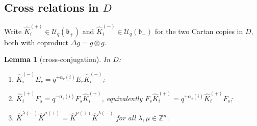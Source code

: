\documentclass[11pt]{article}
\newtheorem{lemma}[theorem]{Lemma}
\theoremstyle{definition}
\theoremstyle{remark}
\newcommand{\Z}{\mathbb{Z}}
\newcommand{\Uq}{\mathcal{U}_q}
\newcommand{\bp}{\mathfrak{b}_+}
\newcommand{\bm}{\mathfrak{b}_-}
\newcommand{\hK}{\hat K}
\begin{document}
\subsection{Cross relations in $D$}\label{sec:cross}

Write $\hK_i^{(+)}\in\Uq(\bp)$ and $\hK_i^{(-)}\in\Uq(\bm)$ for the
two Cartan copies in $D$, both with coproduct $\Delta g=g\otimes g$.

\begin{lemma}[cross-conjugation]\label{lem:cross}
In $D$:
\begin{enumerate}[label=(\alph*),leftmargin=2.2em]
\item $\hK_i^{(-)}E_r=q^{+\alpha_r(i)}E_r\hK_i^{(-)}$;
\item $\hK_i^{(+)}F_s=q^{-\alpha_s(i)}F_s\hK_i^{(+)}$, equivalently
  $F_s\hK_i^{(+)}=q^{+\alpha_s(i)}\hK_i^{(+)}F_s$;
\item $\hK^{\lambda(-)}\hK^{\mu(+)}=\hK^{\mu(+)}\hK^{\lambda(-)}$
  for all $\lambda,\mu\in\Z^n$.
\end{enumerate}
\end{lemma}
\end{document}
